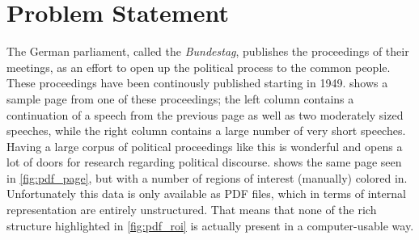 \section{Problem Statement}
\label{sec:problem}
The German parliament, called the \emph{Bundestag}, publishes the proceedings of
their meetings, as an effort to open up the political process to the common
people. These proceedings have been continously published starting in 1949.
 shows a sample page from one of these proceedings; the
left column contains a continuation of a speech from the previous page as well
as two moderately sized speeches, while the right column contains a large number
of very short speeches. Having a large corpus of political proceedings like this
is wonderful and opens a lot of doors for research regarding political
discourse.  shows the same page seen in
\cref{fig:pdf_page}, but with a number of regions of interest (manually)
colored in. Unfortunately this data is only available as PDF files, which in
terms of internal representation are entirely unstructured. That means that none
of the rich structure highlighted in \cref{fig:pdf_roi} is actually
present in a computer-usable way.

